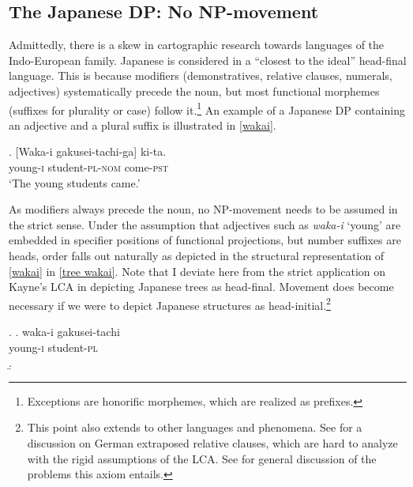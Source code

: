 \documentclass [output=book,colorlinks,citecolor=brown]{langscibook}
\begin{document}
\subsection{The Japanese DP: No NP-movement} \label{japanese no movement}

Admittedly, there is a skew in cartographic research towards languages of the Indo-European family. Japanese is considered in \citet[3–4]{cinque:2017:micro} a ``closest to the ideal'' head-final language. This is because modifiers (demonstratives, relative clauses, numerals, adjectives) systematically precede the noun, but most functional morphemes (suffixes for plurality or case) follow it.\footnote{Exceptions are honorific morphemes, which are realized as prefixes.} An example of a Japanese DP containing an adjective and a plural suffix is illustrated in \ref{wakai}.

\exg. [Waka-i gakusei-tachi-ga] ki-ta.\\
young-\textsc{i} student-\textsc{pl-nom} come-\textsc{pst}\\
`The young students came.’ \label{wakai}

As modifiers always precede the noun, no NP-movement needs to be assumed in the strict sense. Under the assumption that adjectives such as \textit{waka-i} `young’ are embedded in specifier positions of functional projections, but number suffixes are heads, order falls out naturally as depicted in the structural representation of \ref{wakai} in \ref{tree wakai}. Note that I deviate here from the strict application on Kayne’s LCA in depicting Japanese trees as head-final. Movement does become necessary if we were to depict Japanese structures as head-initial.\footnote{This point also extends to other languages and phenomena. See \citet{buering:1997:doing} for a discussion on German extraposed relative clauses, which are hard to analyze with the rigid assumptions of the LCA. See \citet{abels:2012:.linear} for general discussion of the problems this axiom entails.}


\ex. \label{tree wakai} \ag. waka-i gakusei-tachi\\
young-\textsc{i} student-\textsc{pl}\\
\b. 
\end{document}

